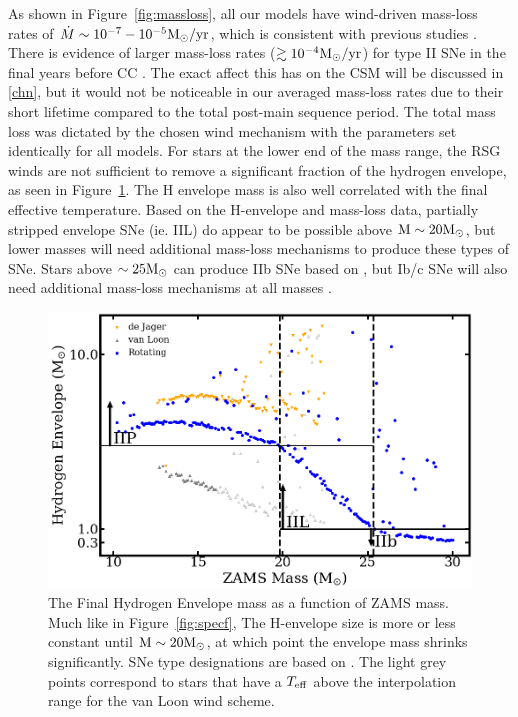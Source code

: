 \documentclass[twocolumn]{aastex631}
\begin{document}
 As shown in Figure~\ref{fig:massloss}, all our models have wind-driven mass-loss rates of $\dot{M}\sim 10^{-7}-10^{-5}\rm M_{\odot}/yr$, which is consistent with previous studies  \citep[e.g.,][]{dwarkadas}. There is evidence of larger mass-loss rates ($\gtrsim 10^{-4}\rm M_{\odot}/yr$) for type II SNe in the final years before CC \citep[e.g.][]{forster}. The exact affect this has on the CSM will be discussed in \ref{chn}, but it would not be noticeable in our averaged mass-loss rates due to their short lifetime compared to the total post-main sequence period. The total mass loss was dictated by the chosen wind mechanism with the parameters set identically for all models. For stars at the lower end of the mass range, the RSG winds are not sufficient to remove a significant fraction of the hydrogen envelope, as seen in Figure~\ref{fig:henv}. The H envelope mass is also well correlated with the final effective temperature. Based on the H-envelope and mass-loss data, partially stripped envelope SNe (ie. IIL) do appear to be possible above $\rm M\sim 20\rm M_{\odot}$, but lower masses will need additional mass-loss mechanisms to produce these types of SNe. Stars above $\sim25 \rm M_{\odot}$ can produce IIb SNe based on \citet{nomoto95}, but Ib/c SNe will also need additional mass-loss mechanisms at all masses \citep[e.g.,][]{sravan19}.
 
 \begin{figure}[hbt!]
    \centering
    \includegraphics[scale=0.250]{henvelopeannotated.png}
    \caption{The Final Hydrogen Envelope mass as a function of ZAMS mass. Much like in Figure~\ref{fig:specf}, The H-envelope size is more or less constant until $\rm M\sim20 \rm M_{\odot}$, at which point the envelope mass shrinks significantly. SNe type designations are based on \citet{nomoto95}. The light grey points correspond to stars that have a $T_{\rm eff}$ above the interpolation range for the van Loon wind scheme.}
    \label{fig:henv}
\end{figure}
\end{document}
